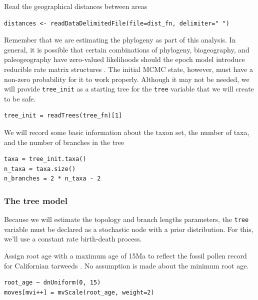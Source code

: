 Read the geographical distances between areas

\begin{snugshade}
\begin{lstlisting}
distances <- readDataDelimitedFile(file=dist_fn, delimiter=" ")
\end{lstlisting}
\end{snugshade}

Remember that we are estimating the phylogeny as part of this analysis.
In general, it is possible that certain combinations of phylogeny, biogeography, and paleogeography have zero-valued likelihoods should the epoch model introduce reducible rate matrix structures \citep[see the supplemental of][]{Buerki2011}.
The initial MCMC state, however, must have a non-zero probability for it to work properly.
Although it may not be needed, we will provide {\tt tree\_init} as a starting tree for the {\tt tree} variable that we will create to be safe.

\begin{snugshade}
\begin{lstlisting}
tree_init = readTrees(tree_fn)[1]
\end{lstlisting}
\end{snugshade}

We will record some basic information about the taxon set, the number of taxa, and the number of branches in the tree

\begin{snugshade}
\begin{lstlisting}
taxa = tree_init.taxa()
n_taxa = taxa.size()
n_branches = 2 * n_taxa - 2
\end{lstlisting}
\end{snugshade}

\subsubsection{The tree model}

Because we will estimate the topology and branch lengths parameters, the {\tt tree} variable must be declared as a stochastic node with a prior distribution.
For this, we'll use a constant rate birth-death process.

Assign root age with a maximum age of 15Ma to reflect the fossil pollen record for Californian tarweeds \citep{Baldwin1998}. No assumption is made about the minimum root age.

\begin{snugshade}
\begin{lstlisting}
root_age ~ dnUniform(0, 15)
moves[mvi++] = mvScale(root_age, weight=2)
\end{lstlisting}
\end{snugshade}

